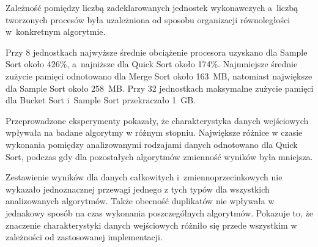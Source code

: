 Zależność pomiędzy liczbą zadeklarowanych jednostek wykonawczych
a~liczbą tworzonych procesów była uzależniona od sposobu organizacji równoległości w~konkretnym algorytmie.

Przy 8 jednostkach najwyższe średnie obciążenie procesora uzyskano dla Sample Sort około 426\%, a~najniższe dla Quick Sort około 174\%. 
Najmniejsze średnie zużycie pamięci odnotowano dla Merge Sort około 163~MB, natomiast największe dla Sample Sort około 258~MB. 
Przy 32 jednostkach maksymalne zużycie pamięci dla Bucket Sort i~Sample Sort przekraczało 1~GB.

Przeprowadzone eksperymenty pokazały, że charakterystyka danych wejściowych wpływała na badane algorytmy w różnym stopniu. 
Największe różnice w czasie wykonania pomiędzy analizowanymi rodzajami danych odnotowano dla Quick Sort, 
podczas gdy dla pozostałych algorytmów zmienność wyników była mniejsza.

Zestawienie wyników dla danych całkowitych i~zmiennoprzecinkowych nie wykazało 
jednoznacznej przewagi jednego z tych typów dla wszystkich analizowanych algorytmów. 
Także obecność duplikatów nie wpływała w jednakowy sposób na czas wykonania poszczególnych algorytmów. 
Pokazuje to, że znaczenie charakterystyki danych wejściowych różniło się przede wszystkim w zależności od zastosowanej implementacji.